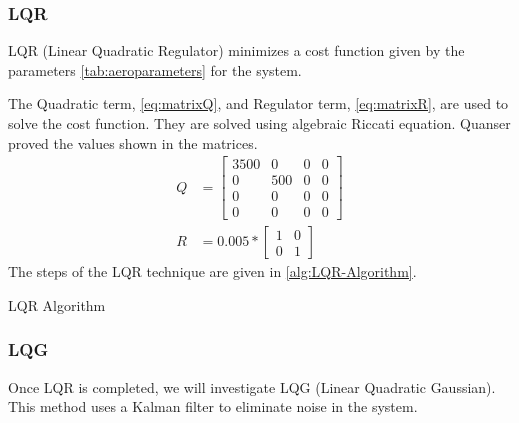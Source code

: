 \documentclass[letterpaper, 10pt, conference]{ieeeconf}
\begin{document}
\subsubsection{LQR}
LQR (Linear Quadratic Regulator) minimizes a cost function given by the parameters \autoref{tab:aeroparameters} for the system.

The Quadratic term, \autoref{eq:matrixQ}, and Regulator term, \autoref{eq:matrixR}, are used to solve the cost function.  They are solved using algebraic Riccati equation.  Quanser proved the values shown in the matrices. 
%
\begin{align}
\label{eq:matrixQ}
Q &= 
\begin{bmatrix}
    3500 & 0 & 0 & 0 \\
    0 & 500 & 0 & 0 \\
    0 & 0 & 0 & 0 \\
    0 & 0 & 0 & 0
\end{bmatrix}
\\
\label{eq:matrixR}
R &= 0.005*
\begin{bmatrix}
    1 & 0 \\
    0 & 1
\end{bmatrix}
\end{align}
%
The steps of the LQR technique  are given in \autoref{alg:LQR-Algorithm}.
\begin{algorithm2e}
\caption{\label{alg:LQR-Algorithm} LQR Algorithm}
\DontPrintSemicolon
{}
\end{algorithm2e}

\subsubsection{LQG}
Once LQR is completed, we will investigate LQG (Linear Quadratic Gaussian).  This method uses a Kalman filter to eliminate noise in the system.
\end{document}

